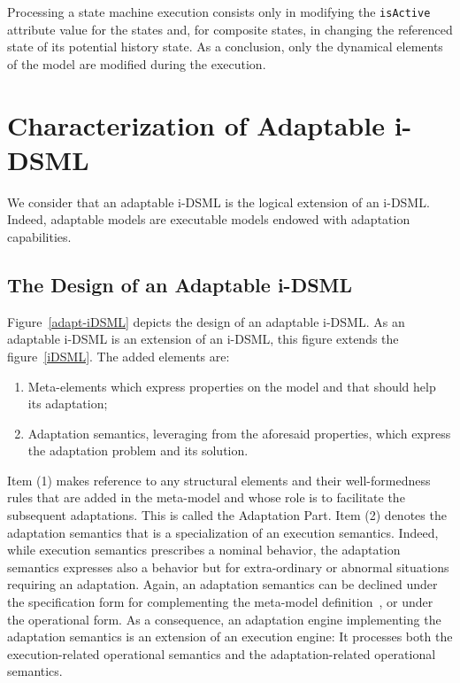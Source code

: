 \documentclass[english, 10pt]{llncs}
\begin{document}
Processing a state machine execution consists only in modifying the
\texttt{isActive} attribute value for the states and, for composite
states, in changing the referenced state of its potential history
state. As a conclusion, only the dynamical elements of the model are
modified during the execution.

\section{Characterization of Adaptable i-DSML}
\label{adaptable-iDSML}

We consider that an adaptable i-DSML is the logical extension of an
i-DSML. Indeed, adaptable models are executable models endowed with
adaptation capabilities. 


\subsection{The Design of an Adaptable i-DSML}

Figure~\ref{adapt-iDSML} depicts the design of an adaptable i-DSML. As
an adaptable i-DSML is an extension of an i-DSML, this figure extends
the figure~\ref{iDSML}. The added elements are:

\begin{enumerate}
	\item Meta-elements which express properties on the model and
          that should help its adaptation;
	\item Adaptation semantics, leveraging from the aforesaid
          properties, which express the adaptation problem and its
          solution.
\end{enumerate}

Item (1) makes reference to any structural elements and their
well-formedness rules that are added in the meta-model and whose role
is to facilitate the subsequent adaptations. This is called the
Adaptation Part. Item (2) denotes the adaptation semantics that is a
specialization of an execution semantics. Indeed, while execution
semantics prescribes a nominal behavior, the adaptation semantics
expresses also a behavior but for extra-ordinary or abnormal
situations requiring an adaptation. Again, an adaptation semantics can
be declined under the specification form for complementing the
meta-model definition~\cite{cariou-ciel12}, or under the operational
form. As a consequence, an adaptation engine implementing the
adaptation semantics is an extension of an execution engine: It
processes both the execution-related operational semantics and the
adaptation-related operational semantics.
\end{document}
